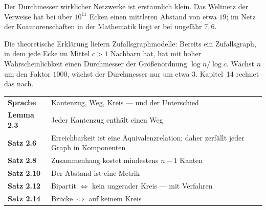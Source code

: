 \begin{forschung}
Der Durchmesser wirklicher Netzwerke ist erstaunlich klein. Das Weltnetz der Verweise hat bei über $10^{11}$ Ecken einen mittleren Abstand von etwa $19$; im Netz der Koautorenschaften in der Mathematik liegt er bei ungefähr $7{,}6$.

Die theoretische Erklärung liefern Zufallsgraphmodelle: Bereits ein Zufallsgraph, in dem jede Ecke im Mittel $c > 1$ Nachbarn hat, hat mit hoher Wahrscheinlichkeit einen Durchmesser der Größenordnung $\log n / \log c$. Wächst $n$ um den Faktor $1000$, wächst der Durchmesser nur um etwa $3$. Kapitel~14 rechnet das nach.

\begin{center}
\begin{minipage}{0.9\textwidth}
\end{minipage}
\end{center}
\end{forschung}

\begin{merksatz}
\begin{center}
\renewcommand{\arraystretch}{1.5}
\begin{tabular}{@{}P{3.0cm}P{5.6cm}@{}}
\toprule
\textbf{Sprache} & Kantenzug, Weg, Kreis --- und der Unterschied\\
\textbf{Lemma 2.3} & Jeder Kantenzug enthält einen Weg\\
\textbf{Satz 2.6} & Erreichbarkeit ist eine Äquivalenzrelation; daher zerfällt jeder Graph in Komponenten\\
\textbf{Satz 2.8} & Zusammenhang kostet mindestens $n-1$ Kanten\\
\textbf{Satz 2.10} & Der Abstand ist eine Metrik\\
\textbf{Satz 2.12} & Bipartit $\iff$ kein ungerader Kreis --- mit Verfahren\\
\textbf{Satz 2.14} & Brücke $\iff$ auf keinem Kreis\\
\bottomrule
\end{tabular}
\end{center}
\end{merksatz}
